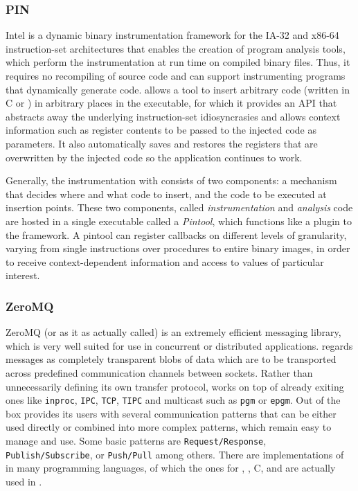 \subsubsection{PIN}
{\small Intel} \pin\cite{pin} is a dynamic binary instrumentation framework for the IA-32 and x86-64 instruction-set architectures 
that enables the creation of program analysis tools, which perform the instrumentation at run time on  
compiled binary files. Thus, it requires no recompiling of source code and can support instrumenting programs that dynamically generate code.
\pin allows a tool to insert arbitrary code (written in {\small C} or \cpp) in arbitrary places in the executable, for which it 
provides an API that abstracts away the underlying instruction-set idiosyncrasies and allows context information 
such as register contents to be passed to the injected code as parameters. It also automatically saves and restores 
the registers that are overwritten by the injected code so the application continues to work.

Generally, the instrumentation with \pin consists of two components: a mechanism that decides where and what code to insert, 
and the code to be executed at insertion points. These two components, called \emph{instrumentation} and \emph{analysis} 
code are hosted in a single executable called a \emph{Pintool}, which functions like a plugin to the \pin framework.
A pintool can register callbacks on different levels of granularity, varying from single instructions over procedures
to entire binary images, in order to receive context-dependent information and access to values of particular interest.
\subsubsection{ZeroMQ}
{\small ZeroMQ}\cite{zmq} (or \zmq as it as actually called) is an extremely efficient messaging library, 
which is very well suited for use in concurrent or distributed applications. \zmq regards messages as 
completely transparent blobs of data which are to be transported across predefined communication channels 
between sockets. Rather than unnecessarily defining its own transfer protocol, \zmq works on top of already exiting 
ones like \texttt{inproc}, \texttt{IPC}, \texttt{TCP}, \texttt{TIPC} and multicast such as \texttt{pgm} or \texttt{epgm}.
Out of the box \zmq provides its users with several communication patterns that can be either used directly or combined 
into more complex patterns, which remain easy to manage and use. Some basic patterns are \texttt{Request/Response}, 
\texttt{Publish/Subscribe}, or \texttt{Push/Pull} among others.
There are implementations of \zmq in many programming languages, of which the ones for \java, \python, {\small C}, 
and \cpp are actually used in \xmlmate.
